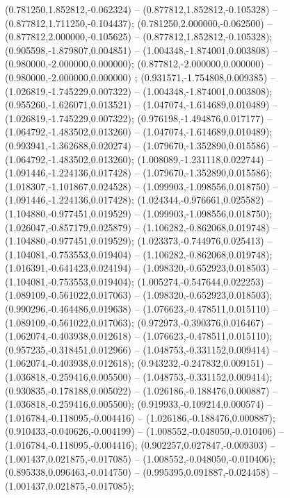  (0.781250,1.852812,-0.062324) -- (0.877812,1.852812,-0.105328) -- (0.877812,1.711250,-0.104437);
 (0.781250,2.000000,-0.062500) -- (0.877812,2.000000,-0.105625) -- (0.877812,1.852812,-0.105328);
 (0.905598,-1.879807,0.004851) -- (1.004348,-1.874001,0.003808) -- (0.980000,-2.000000,0.000000);
 (0.877812,-2.000000,0.000000) -- (0.980000,-2.000000,0.000000) ;
 (0.931571,-1.754808,0.009385) -- (1.026819,-1.745229,0.007322) -- (1.004348,-1.874001,0.003808);
 (0.955260,-1.626071,0.013521) -- (1.047074,-1.614689,0.010489) -- (1.026819,-1.745229,0.007322);
 (0.976198,-1.494876,0.017177) -- (1.064792,-1.483502,0.013260) -- (1.047074,-1.614689,0.010489);
 (0.993941,-1.362688,0.020274) -- (1.079670,-1.352890,0.015586) -- (1.064792,-1.483502,0.013260);
 (1.008089,-1.231118,0.022744) -- (1.091446,-1.224136,0.017428) -- (1.079670,-1.352890,0.015586);
 (1.018307,-1.101867,0.024528) -- (1.099903,-1.098556,0.018750) -- (1.091446,-1.224136,0.017428);
 (1.024344,-0.976661,0.025582) -- (1.104880,-0.977451,0.019529) -- (1.099903,-1.098556,0.018750);
 (1.026047,-0.857179,0.025879) -- (1.106282,-0.862068,0.019748) -- (1.104880,-0.977451,0.019529);
 (1.023373,-0.744976,0.025413) -- (1.104081,-0.753553,0.019404) -- (1.106282,-0.862068,0.019748);
 (1.016391,-0.641423,0.024194) -- (1.098320,-0.652923,0.018503) -- (1.104081,-0.753553,0.019404);
 (1.005274,-0.547644,0.022253) -- (1.089109,-0.561022,0.017063) -- (1.098320,-0.652923,0.018503);
 (0.990296,-0.464486,0.019638) -- (1.076623,-0.478511,0.015110) -- (1.089109,-0.561022,0.017063);
 (0.972973,-0.390376,0.016467) -- (1.062074,-0.403938,0.012618) -- (1.076623,-0.478511,0.015110);
 (0.957235,-0.318451,0.012966) -- (1.048753,-0.331152,0.009414) -- (1.062074,-0.403938,0.012618);
 (0.943232,-0.247832,0.009151) -- (1.036818,-0.259416,0.005500) -- (1.048753,-0.331152,0.009414);
 (0.930835,-0.178188,0.005022) -- (1.026186,-0.188476,0.000887) -- (1.036818,-0.259416,0.005500);
 (0.919933,-0.109214,0.000574) -- (1.016784,-0.118095,-0.004416) -- (1.026186,-0.188476,0.000887);
 (0.910433,-0.040626,-0.004199) -- (1.008552,-0.048050,-0.010406) -- (1.016784,-0.118095,-0.004416);
 (0.902257,0.027847,-0.009303) -- (1.001437,0.021875,-0.017085) -- (1.008552,-0.048050,-0.010406);
 (0.895338,0.096463,-0.014750) -- (0.995395,0.091887,-0.024458) -- (1.001437,0.021875,-0.017085);
